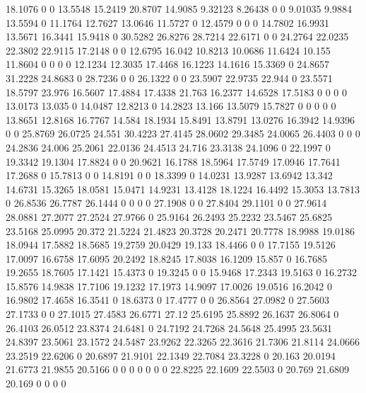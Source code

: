 18.1076 0 0 13.5548 15.2419 20.8707 14.9085 9.32123 8.26438 0 0 9.01035 9.9884 13.5594 0 11.1764 12.7627 13.0646 11.5727 0 12.4579 0 0 0 14.7802 16.9931 13.5671 16.3441 15.9418 0 30.5282 26.8276 28.7214 22.6171 0 0 24.2764 22.0235 22.3802 22.9115 17.2148 0 0 12.6795 16.042 10.8213 10.0686 11.6424 10.155 11.8604 0 0 0 0 12.1234 12.3035 17.4468 16.1223 14.1616 15.3369 0 24.8657 31.2228 24.8683 0 28.7236 0 0 26.1322 0 0 23.5907 22.9735 22.944 0 23.5571 18.5797 23.976 16.5607 17.4884 17.4338 21.763 16.2377 14.6528 17.5183 0 0 0 0 13.0173 13.035 0 14.0487 12.8213 0 14.2823 13.166 13.5079 15.7827 0 0 0 0 0 13.8651 12.8168 16.7767 14.584 18.1934 15.8491 13.8791 13.0276 16.3942 14.9396 0 0 25.8769 26.0725 24.551 30.4223 27.4145 28.0602 29.3485 24.0065 26.4403 0 0 0 24.2836 24.006 25.2061 22.0136 24.4513 24.716 23.3138 24.1096 0 22.1997 0 19.3342 19.1304 17.8824 0 0 20.9621 16.1788 18.5964 17.5749 17.0946 17.7641 17.2688 0 15.7813 0 0 14.8191 0 0 18.3399 0 14.0231 13.9287 13.6942 13.342 14.6731 15.3265 18.0581 15.0471 14.9231 13.4128 18.1224 16.4492 15.3053 13.7813 0 26.8536 26.7787 26.1444 0 0 0 0 27.1908 0 0 27.8404 29.1101 0 0 27.9614 28.0881 27.2077 27.2524 27.9766 0 25.9164 26.2493 25.2232 23.5467 25.6825 23.5168 25.0995 20.372 21.5224 21.4823 20.3728 20.2471 20.7778 18.9988 19.0186 18.0944 17.5882 18.5685 19.2759 20.0429 19.133 18.4466 0 0 17.7155 19.5126 17.0097 16.6758 17.6095 20.2492 18.8245 17.8038 16.1209 15.857 0 16.7685 19.2655 18.7605 17.1421 15.4373 0 19.3245 0 0 15.9468 17.2343 19.5163 0 16.2732 15.8576 14.9838 17.7106 19.1232 17.1973 14.9097 17.0026 19.0516 16.2042 0 16.9802 17.4658 16.3541 0 18.6373 0 17.4777 0 0 26.8564 27.0982 0 27.5603 27.1733 0 0 27.1015 27.4583 26.6771 27.12 25.6195 25.8892 26.1637 26.8064 0 26.4103 26.0512 23.8374 24.6481 0 24.7192 24.7268 24.5648 25.4995 23.5631 24.8397 23.5061 23.1572 24.5487 23.9262 22.3265 22.3616 21.7306 21.8114 24.0666 23.2519 22.6206 0 20.6897 21.9101 22.1349 22.7084 23.3228 0 20.163 20.0194 21.6773 21.9855 20.5166 0 0 0 0 0 0 0 22.8225 22.1609 22.5503 0 20.769 21.6809 20.169 0 0 0 0 
